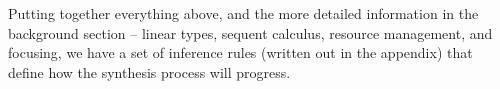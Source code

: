 \documentclass{llncs}
\newcommand{\lolli}{\multimap}
\newcommand{\tensor}{\otimes}
\newcommand{\one}{\mathbf{1}}
\newcommand{\bang}{{!}}
\newcommand{\llet}[2]{\mathsf{let}\,#1\,\mathsf{in}\,#2}
\begin{document}
Putting together everything above, and the more detailed information in the background section -- linear types, sequent calculus, resource management, and focusing,
we have a set of inference rules (written out in the appendix) that define how the synthesis process will progress.














\end{document}
